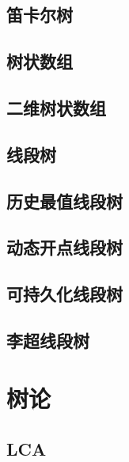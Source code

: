 \documentclass[twocolumn,a4]{article}  %
\begin{document}
	 	\subsection{笛卡尔树}
	 	 	

	 	\subsection{树状数组}
	 	 	
	 	 	
	 	\subsection{二维树状数组}
	 	 	
	 	 	
	 	\subsection{线段树}
	 	 	
	 	 	
		\subsection{历史最值线段树}
	 	 	
	 	 	
	 	\subsection{动态开点线段树}
	 	 	
	 	 	
		\subsection{可持久化线段树}
	 	 	
	 	 	
		\subsection{李超线段树}
			
	 	 	
	\section{树论}
		\subsection{LCA}
	 	 	
	 	 	
\end{document}
